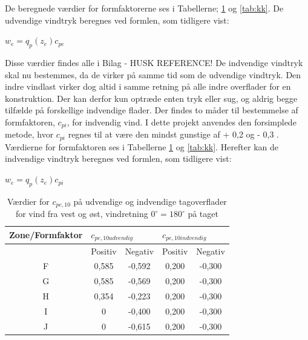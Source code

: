 De beregnede værdier for formfaktorerne ses i Tabellerne; \ref{tab:cc} og \ref{tab:kk}. 
\newline
\newline
De udvendige vindtryk beregnes ved formlen, som tidligere vist:
\begin{center} 
	$w_e=q_p(z_e)c_{pe}$
\end{center}
Disse værdier findes alle i Bilag - HUSK REFERENCE! 
\newline
\newline
De indvendige vindtryk skal nu bestemmes, da de virker på samme tid som de udvendige vindtryk. Den indre vindlast virker dog altid i samme retning på alle indre overflader for en konstruktion. Der kan derfor kun optræde enten tryk eller sug, og aldrig begge tilfælde på forskellige indvendige flader.  
\newline
\newline
Der findes to måder til bestemmelse af formfaktoren, $c_{pi}$, for indvendig vind. I dette projekt anvendes den forsimplede metode, hvor $c_{pi}$ regnes til at være den mindst gunstige af + 0,2 og - 0,3 \citep[Kapitel 7]{EU91}. Værdierne for formfaktoren ses i Tabellerne \ref{tab:cc} og \ref{tab:kk}.
\newline
\newline
Herefter kan de indvendige vindtryk beregnes ved formlen, som tidligere vist:
\begin{center} 
	$w_e=q_p(z_e)c_{pi}$
\end{center}

\begin{table}[htb]
	\begin{center}
		\begin{tabular}{ |c|c|c|c|c| } 
			\hline
			Zone/Formfaktor & \multicolumn{2}{l|}{$c_{pe,10 udvendig}$} & \multicolumn{2}{l|}{$c_{pe,10 indvendig}$} \\	\hline
			& Positiv & Negativ & Positiv & Negativ \\ \hline
			F & 0,585 & -0,592 & 0,200 & -0,300 \\	\hline
			G & 0,585 & -0,569 & 0,200 & -0,300 \\	\hline 
			H & 0,354 & -0,223 & 0,200 & -0,300 \\ 	\hline
			I & 0 & -0,400 & 0,200 & -0,300 \\	\hline
			J & 0 & -0,615 & 0,200 & -0,300 \\	\hline
		\end{tabular}
		\caption{Værdier for $c_{pe,10}$ på udvendige og indvendige tagoverflader for vind fra vest og øst, vindretning $0^{\circ} = 180^{\circ}$ på taget}
		\label{tab:cc}
	\end{center}
\end{table}

